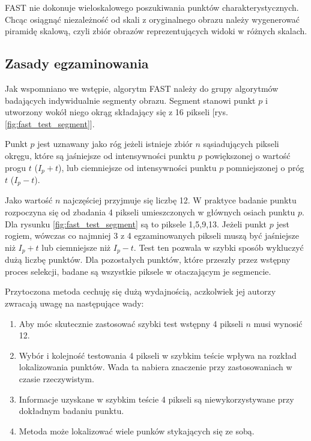 FAST nie dokonuje wieloskalowego poszukiwania punktów charakterystycznych. Chcąc osiągnąć niezależność od skali z oryginalnego obrazu należy wygenerować piramidę skalową, czyli zbiór obrazów reprezentujących widoki w różnych skalach.

\subsection{Zasady egzaminowania}
Jak wspomniano we wstępie, algorytm FAST należy do grupy algorytmów badających indywidualnie segmenty obrazu. Segment stanowi punkt $p$ i utworzony wokół niego okrąg składający się z 16 pikseli [rys. \ref{fig:fast_test_segment}]. 

Punkt $p$ jest uznawany jako róg jeżeli istnieje zbiór $n$ sąsiadujących pikseli okręgu, które są jaśniejsze od  intensywności punktu $p$ powiększonej o wartość progu $t$ ($I_p + t$), lub ciemniejsze od intensywności punktu $p$ pomniejszonej o próg $t$ ($I_p - t$). 

Jako wartość $n$ najczęściej przyjmuje się liczbę 12. W praktyce badanie punktu rozpoczyna się od zbadania 4 pikseli umieszczonych w głównych osiach punktu $p$. Dla rysunku \ref{fig:fast_test_segment} są to piksele 1,5,9,13. Jeżeli punkt $p$ jest rogiem, wówczas co najmniej 3 z 4 egzaminowanych pikseli muszą być jaśniejsze niż $I_p + t$ lub ciemniejsze niż $I_p - t$. Test ten pozwala w szybki sposób wykluczyć dużą liczbę punktów. Dla pozostałych punktów, które przeszły przez wstępny proces selekcji, badane są wszystkie piksele w otaczającym je segmencie.

Przytoczona metoda cechuję się dużą wydajnością, aczkolwiek jej autorzy zwracają uwagę na następujące wady:
\begin{enumerate}
\item Aby móc skutecznie zastosować szybki test wstępny 4 pikseli $n$ musi wynosić 12.
\item Wybór i kolejność testowania 4 pikseli w szybkim teście wpływa na rozkład lokalizowania punktów. Wada ta nabiera znaczenie przy zastosowaniach w czasie rzeczywistym.
\item Informacje uzyskane w szybkim teście 4 pikseli są niewykorzystywane przy dokładnym badaniu punktu.
\item Metoda może lokalizować wiele punków stykających się ze sobą.
\end{enumerate}



